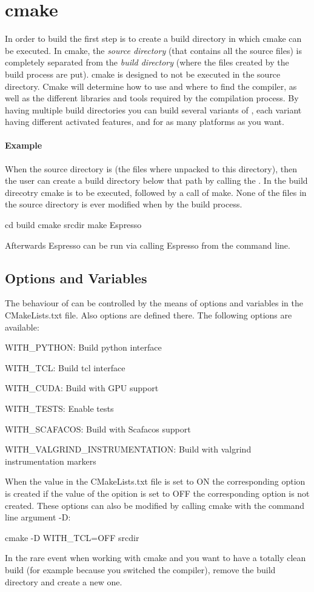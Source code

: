 \section{cmake}
In order to build \es the first step is to create a build directory in which cmake can be executed. In cmake, the \emph{source directory} (that contains all the source
files) is completely separated from the \emph{build directory} (where the files created by the build process are put). cmake is designed to not be executed in the source directory.
Cmake will determine how to use and where to find
the compiler, as well as the different libraries and tools required by
the compilation process. By having multiple build directories you can build several
variants of \es, each variant having different activated features, and
for as many platforms as you want.

\paragraph{Example}
When the source directory is  (\ie the files where
unpacked to this directory), then the user can create a build directory
 below that path by calling the . In the build direcotry cmake is to be executed, followed by a call of make. None of the files in the source directory is ever modified when by the build process.
\begin{code}
cd build
cmake srcdir
make
Espresso
\end{code}
Afterwards Espresso can be run via calling Espresso from the command line.
\subsection{Options and Variables}
The behaviour of  can be
controlled by the means of options and variables in the CMakeLists.txt file. Also options are defined there.
The following options are available:
\begin{description}
	\item WITH_PYTHON: Build python interface
	\item WITH_TCL: Build tcl interface
	\item WITH_CUDA: Build with GPU support
	\item WITH_TESTS: Enable tests
	\item WITH_SCAFACOS: Build with Scafacos support
	\item WITH_VALGRIND_INSTRUMENTATION: Build with valgrind instrumentation markers
\end{description}
When the value in the CMakeLists.txt file is set to ON the corresponding option is created if the value of the opition is set to OFF the corresponding option is not created. 
These options can also be modified by calling cmake with the command line argument -D:
\begin{code}
cmake -D WITH_TCL=OFF srcdir 
\end{code}
In the rare event when working with cmake and you want to have a totally clean build (for example because you switched the compiler), remove the build directory and create a new one.
